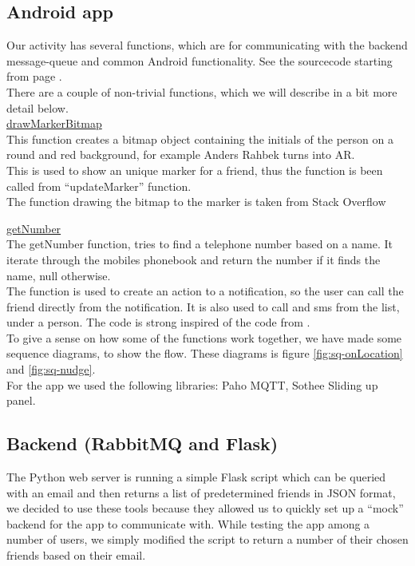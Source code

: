 \documentclass[runningheads,a4paper]{llncs}
\begin{document}
\subsection{Android app}
Our activity has several functions, which are for communicating with the backend message-queue and common Android functionality. See the sourcecode starting from page \pageref{source-code}. \\
There are a couple of non-trivial functions, which we will describe in a bit more detail below.\\

\underline{drawMarkerBitmap}\\
This function creates a bitmap object containing the initials of the person on a round and red background, for example Anders Rahbek turns into AR.\\

This is used to show an unique marker for a friend, thus the function is been called from “updateMarker” function. \\
The function drawing the bitmap to the marker is taken from Stack Overflow\cite{bitmapstackoverflow}

\underline{getNumber}\\
The getNumber function, tries to find a telephone number based on a name. It iterate through the mobiles phonebook and return the number if it finds the name, null otherwise. \\

The function is used to create an action to a notification, so the user can call the friend directly from the notification. It is also used to call and sms from the list, under a person. 
The code is strong inspired of the code from \cite{number}.\\


To give a sense on how some of the functions work together, we have made some sequence diagrams, to show the flow. These diagrams is figure \ref{fig:sq-onLocation} and \ref{fig:sq-nudge}.\\ 

For the app we used the following libraries: Paho MQTT\cite{paho}, Sothee Sliding up panel\cite{slidinguppanel}.


\subsection{Backend (RabbitMQ and Flask)}
The Python web server is running a simple Flask\cite{flask} script which can be queried with an email and then returns a list of predetermined friends in JSON format, we decided to use these tools because they allowed us to quickly set up a “mock” backend for the app to communicate with. While testing the app among a number of users, we simply modified the script to return a number of their chosen friends based on their email.\\
\end{document}
